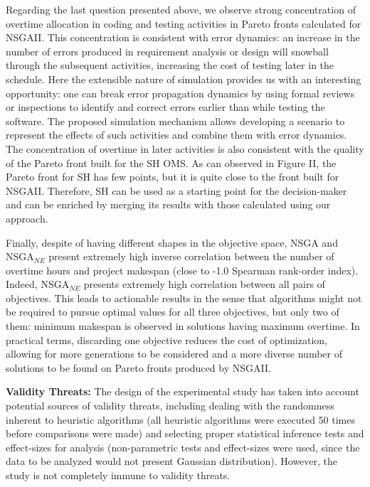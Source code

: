 \documentclass[conference]{IEEEtran}
\begin{document}
Regarding the last question presented above, we observe strong concentration of overtime allocation in coding and testing activities in Pareto fronts calculated for NSGAII. This concentration is consistent with error dynamics: an increase in the number of errors produced in requirement analysis or design will snowball through the subsequent activities, increasing the cost of testing later in the schedule. Here the extensible nature of simulation provides us with an interesting opportunity: one can break error propagation dynamics by using formal reviews or inspections to identify and correct errors earlier than while testing the software. The proposed simulation mechanism allows developing a scenario to represent the effects of such activities \cite{Madachy:1996} and combine them with error dynamics. The concentration of overtime in later activities is also consistent with the quality of the Pareto front built for the SH OMS. As can observed in Figure II, the Pareto front for SH has few points, but it is quite close to the front built for NSGAII. Therefore, SH can be used as a starting point for the decision-maker and can be enriched by merging its results with those calculated using our approach.

Finally, despite of having different shapes in the objective space, NSGA and NSGA$_{NE}$ present extremely high inverse correlation between the number of overtime hours and project makespan (close to -1.0 Spearman rank-order index). Indeed, NSGA$_{NE}$ presents extremely high correlation between all pairs of objectives. This leads to actionable results in the sense that algorithms might not be required to pursue optimal values for all three objectives, but only two of them: minimum makespan is observed in solutions having maximum overtime. In practical terms, discarding one objective reduces the cost of optimization, allowing for more generations to be considered and a more diverse number of solutions to be found on Pareto fronts produced by NSGAII.

\vspace{3px}
\noindent
\textbf{Validity Threats:} The design of the experimental study has taken into account potential sources of validity threats, including dealing with the randomness inherent to heuristic algorithms (all heuristic algorithms were executed 50 times before comparisons were made) and selecting proper statistical inference tests and effect-sizes for analysis (non-parametric tests and effect-sizes were used, since the data to be analyzed would not present Gaussian distribution). However, the study is not completely immune to validity threats.
\end{document}
